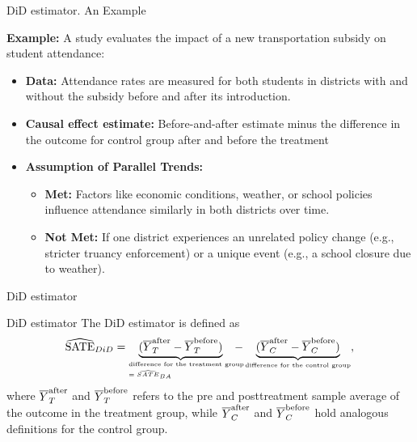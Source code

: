 \documentclass[aspectratio=169]{beamer}
\begin{document}
\begin{frame}{DiD estimator. An Example}

    \textbf{Example:} A study evaluates the impact of a new transportation subsidy on student attendance:
    \begin{itemize}
        \item \textbf{Data:} Attendance rates are measured for both students in districts with and without the subsidy before and after its introduction.
        \item \textbf{Causal effect estimate:} Before-and-after estimate minus the difference in the outcome for control group after and before the treatment
        \item \textbf{Assumption of Parallel Trends:}
        \begin{itemize}
            \item[$\bullet$] \textbf{Met:} Factors like economic conditions, weather, or school policies influence attendance similarly in both districts over time.
            \item[$\bullet$] \textbf{Not Met:} If one district experiences an unrelated policy change (e.g., stricter truancy enforcement) or a unique event (e.g., a school closure due to weather).
        \end{itemize}
    \end{itemize}
    
\end{frame}

\begin{frame}{DiD estimator}

\begin{coolblock}{DiD estimator}
    The DiD estimator is defined as
    $$
    \widehat{\mathrm{SATE}}_{DiD} 
    = \underbrace{(\oline{Y}_T^{\mathrm{after}} - \oline{Y}_T^{\mathrm{before}})}_{\parbox{3.25cm}{\text{\tiny difference for the treatment group} \\ [-0.1cm] {\tiny $ = \widehat{SATE}_{BA}$}}}  - \underbrace{(\oline{Y}_C^{\mathrm{after}} - \oline{Y}_C^{\mathrm{before}})}_{\text{\tiny difference for the control group}},
    $$ 
    where $\overline{Y}_T^{\mathrm{after}}$ and $\overline{Y}_T^{\mathrm{before}}$ refers to the pre and posttreatment sample average of the outcome in the treatment group, while $\overline{Y}_C^{\mathrm{after}}$ and $\overline{Y}_C^{\mathrm{before}}$ hold analogous definitions for the control group.
\end{coolblock}
    
\end{frame}
\end{document}
